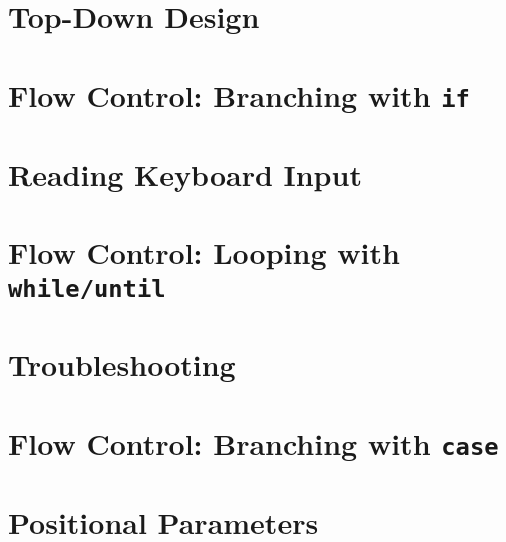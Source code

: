 \documentclass[oneside]{book}
\numberwithin{equation}{section}
\begin{document}

\section{Top-Down Design}


\section{Flow Control: Branching with \texttt{if}}


\section{Reading Keyboard Input}


\section{Flow Control: Looping with \texttt{while/until}}


\section{Troubleshooting}


\section{Flow Control: Branching with \texttt{case}}


\section{Positional Parameters}

\end{document}
